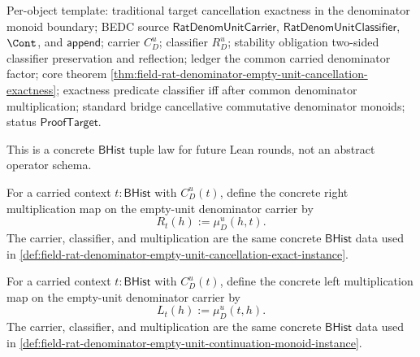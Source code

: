 Per-object template: traditional target cancellation exactness in the
denominator monoid boundary; BEDC source $\mathsf{RatDenomUnitCarrier}$,
$\mathsf{RatDenomUnitClassifier}$, $\Cont$, and $\mathsf{append}$; carrier
$C_D^u$; classifier $R_D^u$; stability obligation two-sided classifier
preservation and reflection; ledger the common carried denominator factor; core
theorem \autoref{thm:field-rat-denominator-empty-unit-cancellation-exactness};
exactness predicate classifier iff after common denominator multiplication;
standard bridge cancellative commutative denominator monoids; status
$\mathsf{ProofTarget}$.

This is a concrete $\mathsf{BHist}$ tuple law for future Lean rounds, not an
abstract operator schema.

\begin{definition}
\label{def:field-rat-denominator-empty-unit-right-multiplication-context}
For a carried context $t:\mathsf{BHist}$ with $C_D^u(t)$, define the concrete
right multiplication map on the empty-unit denominator carrier by
$$
R_t(h):=\mu_D^u(h,t).
$$
The carrier, classifier, and multiplication are the same concrete
$\mathsf{BHist}$ data used in
\autoref{def:field-rat-denominator-empty-unit-cancellation-exact-instance}.
\end{definition}

\begin{definition}
\label{def:field-rat-denominator-empty-unit-left-multiplication-context}
For a carried context $t:\mathsf{BHist}$ with $C_D^u(t)$, define the concrete
left multiplication map on the empty-unit denominator carrier by
$$
L_t(h):=\mu_D^u(t,h).
$$
The carrier, classifier, and multiplication are the same concrete
$\mathsf{BHist}$ data used in
\autoref{def:field-rat-denominator-empty-unit-continuation-monoid-instance}.
\end{definition}

